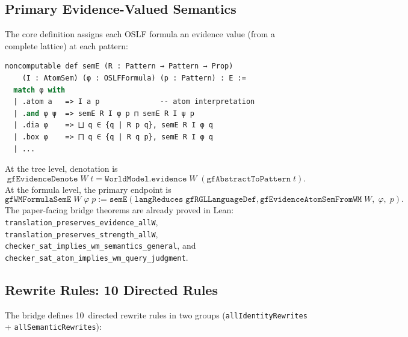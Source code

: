 \documentclass[11pt]{article}
\newcommand{\code}[1]{\texttt{#1}}
\newcommand{\OSLF}{\textup{OSLF}}
\begin{document}
\subsection{Primary Evidence-Valued Semantics}

The core definition assigns each \OSLF{} formula an evidence value (from a
complete lattice) at each pattern:

\begin{lstlisting}[language=ml,caption={Evidence-valued formula semantics}]
noncomputable def semE (R : Pattern → Pattern → Prop)
    (I : AtomSem) (φ : OSLFFormula) (p : Pattern) : E :=
  match φ with
  | .atom a   => I a p              -- atom interpretation
  | .and φ ψ  => semE R I φ p ⊓ semE R I ψ p
  | .dia φ    => ⨆ q ∈ {q | R p q}, semE R I φ q
  | .box φ    => ⨅ q ∈ {q | R q p}, semE R I φ q
  | ...
\end{lstlisting}

At the tree level, denotation is
\[
  \texttt{gfEvidenceDenote}\; W\; t
  = \texttt{WorldModel.evidence}\; W\; (\texttt{gfAbstractToPattern}\; t).
\]
At the formula level, the primary endpoint is
\[
  \texttt{gfWMFormulaSemE}\; W\; \varphi\; p
  := \texttt{semE}(\texttt{langReduces}\;\texttt{gfRGLLanguageDef},
      \texttt{gfEvidenceAtomSemFromWM}\; W,\; \varphi,\; p).
\]
The paper-facing bridge theorems are already proved in Lean:
\code{translation\_preserves\_evidence\_allW},
\code{translation\_preserves\_strength\_allW},
\code{checker\_sat\_implies\_wm\_semantics\_general}, and
\code{checker\_sat\_atom\_implies\_wm\_query\_judgment}.

\subsection{Rewrite Rules: 10 Directed Rules}

The bridge defines 10~directed rewrite rules in two groups
(\code{allIdentityRewrites} + \code{allSemanticRewrites}):
\end{document}
